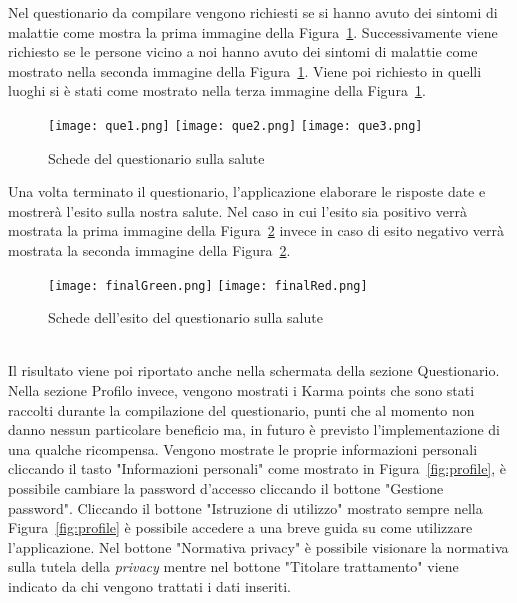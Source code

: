 \begin{trivlist}
	Nel questionario da compilare vengono richiesti se si hanno avuto dei sintomi di malattie come mostra la prima immagine della Figura~\ref{fig:queSlide}. Successivamente viene richiesto se le persone vicino a noi hanno avuto dei sintomi di malattie come mostrato nella seconda immagine della Figura~\ref{fig:queSlide}. Viene poi richiesto in quelli luoghi si è stati come mostrato nella terza immagine della Figura~\ref{fig:queSlide}.
	\begin{figure}[h]
		\begin{center}
			\texttt{[image: que1.png]}\hfill
			\texttt{[image: que2.png]}\hfill
			\texttt{[image: que3.png]}
			\caption{Schede del questionario sulla salute}\label{fig:queSlide}
		\end{center}
	\end{figure}
	Una volta terminato il questionario, l'applicazione elaborare le risposte date e mostrerà l'esito sulla nostra salute. Nel caso in cui l'esito sia positivo verrà mostrata la prima immagine della Figura~\ref{fig:quefinal} invece in caso di esito negativo verrà mostrata la seconda immagine della Figura~\ref{fig:quefinal}.
	\begin{figure}[h]
		\begin{center}
			\texttt{[image: finalGreen.png]}\hfil
			\texttt{[image: finalRed.png]}
			\caption{Schede dell'esito del questionario sulla salute}\label{fig:quefinal}
		\end{center}
	\end{figure}\\
	Il risultato viene poi riportato anche nella schermata della sezione Questionario.
	\\
	Nella sezione Profilo invece, vengono mostrati i Karma points che sono stati raccolti durante la compilazione del questionario, punti che al momento non danno nessun particolare beneficio ma, in futuro è previsto l'implementazione di una qualche ricompensa. Vengono mostrate le proprie informazioni personali cliccando il tasto "Informazioni personali" come mostrato in Figura~\ref{fig:profile}, è possibile cambiare la password d'accesso cliccando il bottone "Gestione password". Cliccando il bottone "Istruzione di utilizzo" mostrato sempre nella Figura~\ref{fig:profile} è possibile accedere a una breve guida su come utilizzare l'applicazione. Nel bottone "Normativa privacy" è possibile visionare la normativa sulla tutela della \emph{privacy}  mentre nel bottone "Titolare trattamento" viene indicato da chi vengono trattati i dati inseriti.

\end{trivlist}
